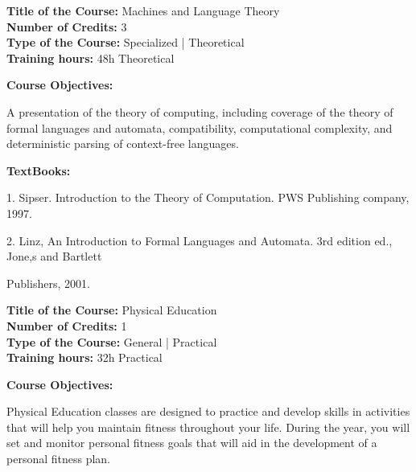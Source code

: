 \documentclass[12pt,a4paper]{article}
\begin{document}
\newpage
\textbf{Title of the Course:} Machines and Language Theory\\
\textbf{Number of Credits:} 3\\
\textbf{Type of the Course:} Specialized | Theoretical\\
\textbf{Training hours:} 48h Theoretical\par\vspace{4pt}
\textbf{Course Objectives:}\par\vspace{2pt}
A presentation of the theory of computing, including coverage of the theory of formal languages
and automata, compatibility, computational complexity, and deterministic parsing of context-free
languages.\par\vspace{4pt}
\textbf{TextBooks:}\par\vspace{2pt}
1. Sipser. Introduction to the Theory of Computation. PWS Publishing company, 1997.\par
2. Linz, An Introduction to Formal Languages and Automata. 3rd edition ed., Jone,s and Bartlett\par
Publishers, 2001.\par
\vspace{4pt}

\newpage
\nopagebreak
\textbf{Title of the Course:} Physical Education\\
\textbf{Number of Credits:} 1\\
\textbf{Type of the Course:} General | Practical\\
\textbf{Training hours:} 32h Practical\par\vspace{4pt}
\textbf{Course Objectives:}\par\vspace{2pt}
Physical Education classes are designed to practice and develop skills in activities that will help
you maintain fitness throughout your life. During the year, you will set and monitor personal
fitness goals that will aid in the development of a personal fitness plan.\par\vspace{4pt}
\end{document}
